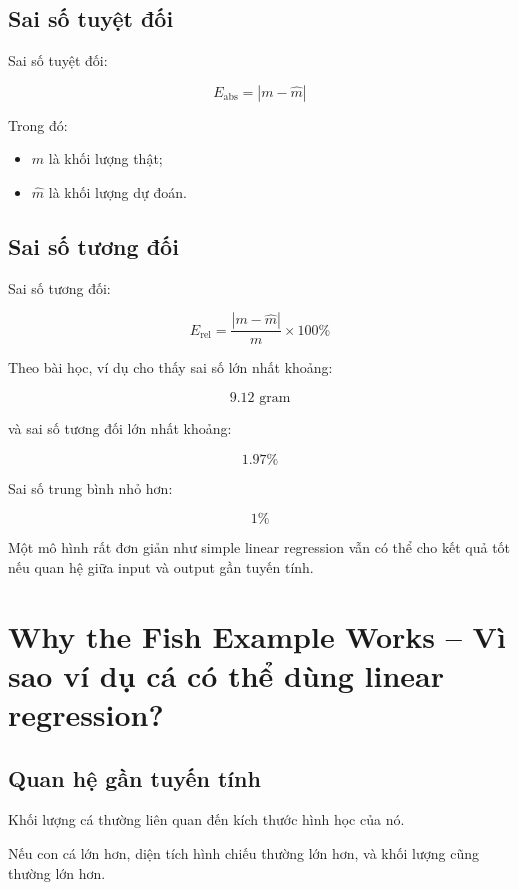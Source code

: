 \subsection{Sai số tuyệt đối}

Sai số tuyệt đối:

\[
    E_{\text{abs}}
    =
    |m-\hat{m}|
\]

Trong đó:

\begin{itemize}
    \item $m$ là khối lượng thật;
    \item $\hat{m}$ là khối lượng dự đoán.
\end{itemize}

\subsection{Sai số tương đối}

Sai số tương đối:

\[
    E_{\text{rel}}
    =
    \frac{|m-\hat{m}|}{m}\times100\%
\]

Theo bài học, ví dụ cho thấy sai số lớn nhất khoảng:

\[
    9.12 \text{ gram}
\]

và sai số tương đối lớn nhất khoảng:

\[
    1.97\%
\]

Sai số trung bình nhỏ hơn:

\[
    1\%
\]

\begin{ghinho}
Một mô hình rất đơn giản như simple linear regression vẫn có thể cho kết quả tốt nếu quan hệ giữa input và output gần tuyến tính.
\end{ghinho}

\section{Why the Fish Example Works -- Vì sao ví dụ cá có thể dùng linear regression?}

\subsection{Quan hệ gần tuyến tính}

Khối lượng cá thường liên quan đến kích thước hình học của nó.

Nếu con cá lớn hơn, diện tích hình chiếu thường lớn hơn, và khối lượng cũng thường lớn hơn.

